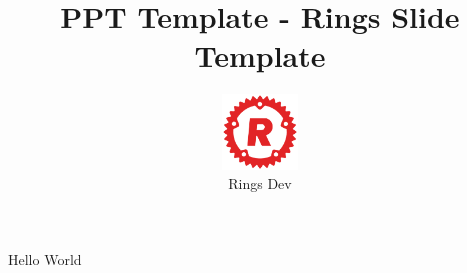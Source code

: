 

\title[Rings Slide Template]{PPT Template - Rings Slide Template}

\author[Rings Dev]{
  \includegraphics[height=2cm]{./_temp/rings_rust.png}
  \\
  Rings Dev
}



\begin{frame}
    \titlepage
\end{frame}

\begin{frame}
  Hello World
\end{frame}

